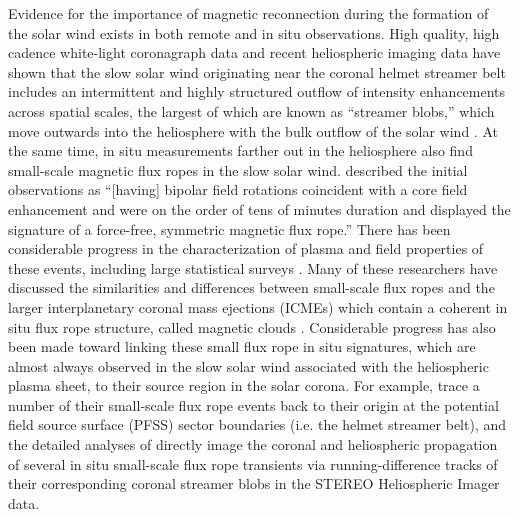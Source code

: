 \documentclass[preprint]{aastex62}
\begin{document}
Evidence for the importance of magnetic reconnection during the formation of the solar wind exists in both 
remote and in situ observations.
High quality, high cadence white-light coronagraph data and recent
heliospheric imaging data have shown that the slow solar wind
originating near the coronal helmet streamer belt includes an
intermittent and highly structured outflow of intensity enhancements
across spatial scales, the largest of which are known as ``streamer
blobs,'' which move outwards into the heliosphere with the bulk
outflow of the solar wind \citep{Sheeley1997, Sheeley1999, Sheeley2007,
Sheeley2009, Song2009, Rouillard2010a, Rouillard2010b, Viall2015, Sanchez-Diaz2017}.
%
At the same time, in situ measurements farther out in the heliosphere also find 
small-scale magnetic flux ropes in the slow solar wind.
%
\citet{Cartwright2010} described the initial \citet{Moldwin2000}
observations as ``[having] bipolar field rotations coincident with
a core field enhancement and were on the order of tens of minutes
duration and displayed the signature of a force-free, symmetric
magnetic flux rope.'' There has been considerable progress in the
characterization of plasma and field properties of these events,
including large statistical surveys \citep{Feng2007, Feng2008,
Cartwright2008, Cartwright2010, Kilpua2009b, Foullon2011, Janvier2014a,
Janvier2014b, Feng2015a,Feng2015b, Yu2014, Yu2016}.
%
Many of these researchers \citep[e.g.][and others]{Janvier2014b,Yu2014}
have discussed the similarities and differences between small-scale
flux ropes and the larger interplanetary coronal mass ejections
(ICMEs) which contain a coherent in situ flux rope structure, called
magnetic clouds \citep[][]{Burlaga1981, Marubashi1986, Burlaga1988,
Lepping1990}.
%
Considerable progress has also been made toward linking these small
flux rope in situ signatures, which are almost always observed in
the slow solar wind associated with the heliospheric plasma sheet,
to their source region in the solar corona. For example,
\citet{Kilpua2009b} trace a number of their small-scale flux rope
events back to their origin at the potential field source surface
(PFSS) sector boundaries (i.e. the helmet streamer belt), and
the detailed analyses of \citet{Rouillard2011} directly image the
coronal and heliospheric propagation of several in situ small-scale
flux rope transients via running-difference tracks of their
corresponding coronal streamer blobs in the STEREO Heliospheric
Imager data.
\end{document}
